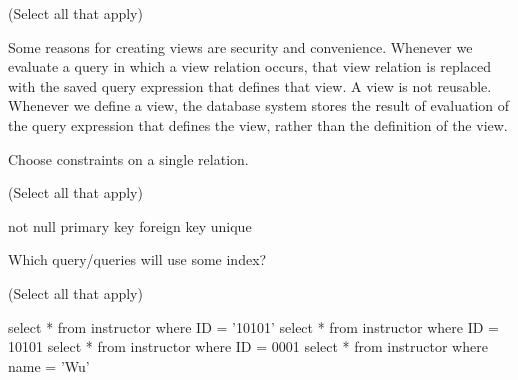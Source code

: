 \documentclass[12pt, addpoints]{exam}
\begin{document}
\begin{questions}
\begin{minipage}{\linewidth}
(Select all that apply)\par\vspace{0.5em}
\begin{checkboxes}
    \CorrectChoice Some reasons for creating views are security and convenience.
    \CorrectChoice Whenever we evaluate a query in which a view relation occurs, that view relation is replaced with the saved query expression that defines that view.
    \choice A view is not reusable.
    \choice Whenever we define a view, the database system stores the result of evaluation of the query expression that defines the view, rather than the definition of the view.
\end{checkboxes}
\end{minipage}

\begin{minipage}{\linewidth}
\question[4]
Choose constraints on a single relation.\par\vspace{0.5em}

(Select all that apply)\par\vspace{0.5em}
\begin{checkboxes}
    \CorrectChoice not null
    \CorrectChoice primary key
    \choice foreign key
    \CorrectChoice unique
\end{checkboxes}
\end{minipage}

\begin{minipage}{\linewidth}
\question[4]
Which query/queries will use some index?\par\vspace{0.5em}

(Select all that apply)\par\vspace{0.5em}
\begin{checkboxes}
    \CorrectChoice select * from instructor where ID = '10101'
    \choice select * from instructor where ID = 10101
    \choice select * from instructor where ID = 0001
    \choice select * from instructor where name = 'Wu'
\end{checkboxes}
\end{minipage}


\end{questions}
\end{document}
